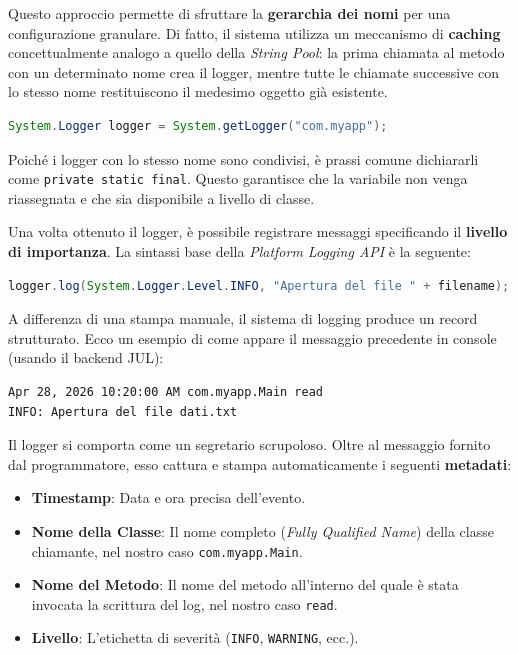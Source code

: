 Questo approccio permette di sfruttare la \textbf{gerarchia dei nomi} per una configurazione granulare. Di fatto, il sistema utilizza un meccanismo di \textbf{caching} concettualmente analogo a quello della \textit{String Pool}: la prima chiamata al metodo con un determinato nome crea il logger, mentre tutte le chiamate successive con lo stesso nome restituiscono il medesimo oggetto già esistente.

\begin{lstlisting}[language=Java, caption={Recupero di un Logger}]
System.Logger logger = System.getLogger("com.myapp");
\end{lstlisting}

\begin{tip}
Poiché i logger con lo stesso nome sono condivisi, è prassi comune dichiararli come \texttt{private static final}. Questo garantisce che la variabile non venga riassegnata e che sia disponibile a livello di classe.
\end{tip}

Una volta ottenuto il logger, è possibile registrare messaggi specificando il \textbf{livello di importanza}. La sintassi base della \textit{Platform Logging API} è la seguente:

\begin{lstlisting}[language=Java, caption={Esempio di registrazione di un messaggio}]
logger.log(System.Logger.Level.INFO, "Apertura del file " + filename);
\end{lstlisting}

A differenza di una stampa manuale, il sistema di logging produce un record strutturato. Ecco un esempio di come appare il messaggio precedente in console (usando il backend JUL):

\begin{lstlisting}[language=bash]
Apr 28, 2026 10:20:00 AM com.myapp.Main read
INFO: Apertura del file dati.txt
\end{lstlisting}

Il logger si comporta come un segretario scrupoloso. Oltre al messaggio fornito dal programmatore, esso cattura e stampa automaticamente i seguenti \textbf{metadati}:
\begin{itemize}
    \item \textbf{Timestamp}: Data e ora precisa dell'evento.
    \item \textbf{Nome della Classe}: Il nome completo (\textit{Fully Qualified Name}) della classe chiamante, nel nostro caso \texttt{com.myapp.Main}.
    \item \textbf{Nome del Metodo}: Il nome del metodo all'interno del quale è stata invocata la scrittura del log, nel nostro caso \texttt{read}.
    \item \textbf{Livello}: L'etichetta di severità (\texttt{INFO}, \texttt{WARNING}, ecc.).
\end{itemize}

